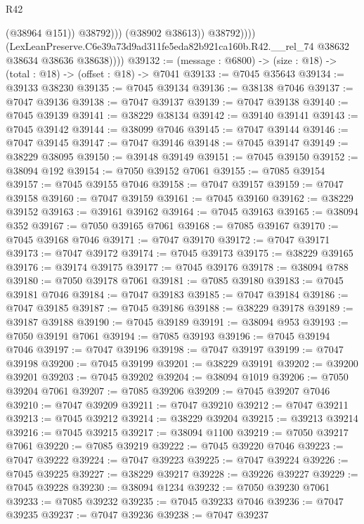 \begin{lexlean}{R42}
\begin{coremodule}
{                            (@38964 @151))
                          @38792)))
                    (@38902 @38613))
                  @38792))))
          (LexLeanPreserve.C6e39a73d9ad311fe5eda82b921ca160b.R42.__rel_74
            @38632
            @38634
            @38636
            @38638))))
@39132 := (message : @6800) -> (size : @18) -> (total : @18) -> (offset : @18) -> @7041
@39133 := @7045 @35643
@39134 := @39133 @38230
@39135 := @7045 @39134
@39136 := @38138 @7046
@39137 := @7047 @39136
@39138 := @7047 @39137
@39139 := @7047 @39138
@39140 := @7045 @39139
@39141 := @38229 @38134
@39142 := @39140 @39141
@39143 := @7045 @39142
@39144 := @38099 @7046
@39145 := @7047 @39144
@39146 := @7047 @39145
@39147 := @7047 @39146
@39148 := @7045 @39147
@39149 := @38229 @38095
@39150 := @39148 @39149
@39151 := @7045 @39150
@39152 := @38094 @192
@39154 := @7050 @39152 @7061
@39155 := @7085 @39154
@39157 := @7045 @39155 @7046
@39158 := @7047 @39157
@39159 := @7047 @39158
@39160 := @7047 @39159
@39161 := @7045 @39160
@39162 := @38229 @39152
@39163 := @39161 @39162
@39164 := @7045 @39163
@39165 := @38094 @352
@39167 := @7050 @39165 @7061
@39168 := @7085 @39167
@39170 := @7045 @39168 @7046
@39171 := @7047 @39170
@39172 := @7047 @39171
@39173 := @7047 @39172
@39174 := @7045 @39173
@39175 := @38229 @39165
@39176 := @39174 @39175
@39177 := @7045 @39176
@39178 := @38094 @788
@39180 := @7050 @39178 @7061
@39181 := @7085 @39180
@39183 := @7045 @39181 @7046
@39184 := @7047 @39183
@39185 := @7047 @39184
@39186 := @7047 @39185
@39187 := @7045 @39186
@39188 := @38229 @39178
@39189 := @39187 @39188
@39190 := @7045 @39189
@39191 := @38094 @953
@39193 := @7050 @39191 @7061
@39194 := @7085 @39193
@39196 := @7045 @39194 @7046
@39197 := @7047 @39196
@39198 := @7047 @39197
@39199 := @7047 @39198
@39200 := @7045 @39199
@39201 := @38229 @39191
@39202 := @39200 @39201
@39203 := @7045 @39202
@39204 := @38094 @1019
@39206 := @7050 @39204 @7061
@39207 := @7085 @39206
@39209 := @7045 @39207 @7046
@39210 := @7047 @39209
@39211 := @7047 @39210
@39212 := @7047 @39211
@39213 := @7045 @39212
@39214 := @38229 @39204
@39215 := @39213 @39214
@39216 := @7045 @39215
@39217 := @38094 @1100
@39219 := @7050 @39217 @7061
@39220 := @7085 @39219
@39222 := @7045 @39220 @7046
@39223 := @7047 @39222
@39224 := @7047 @39223
@39225 := @7047 @39224
@39226 := @7045 @39225
@39227 := @38229 @39217
@39228 := @39226 @39227
@39229 := @7045 @39228
@39230 := @38094 @1234
@39232 := @7050 @39230 @7061
@39233 := @7085 @39232
@39235 := @7045 @39233 @7046
@39236 := @7047 @39235
@39237 := @7047 @39236
@39238 := @7047 @39237
}
\end{coremodule}
\end{lexlean}
